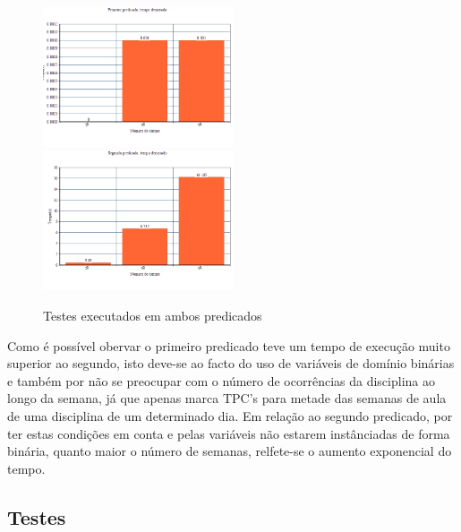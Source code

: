 \documentclass{llncs}
\begin{document}
\begin{figure}
\includegraphics[width=0.5\textwidth]{g1}
\includegraphics[width=0.5\textwidth]{g2}
\caption{Testes executados em ambos predicados}
\end{figure}
\FloatBarrier

Como é possível obervar o primeiro predicado teve um tempo de execução muito superior ao segundo, isto deve-se ao facto do uso de variáveis de domínio binárias e também por não se preocupar com o número de ocorrências da disciplina ao longo da semana, já que apenas marca TPC's para metade das semanas de aula de uma disciplina de um determinado dia.
Em relação ao segundo predicado, por ter estas condições em conta e pelas variáveis não estarem instânciadas de forma binária, quanto maior o número de semanas, relfete-se o aumento exponencial do tempo.

\subsection{ Testes}
\end{document}
